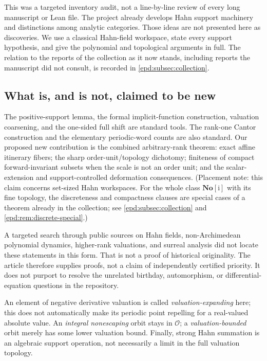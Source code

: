 \documentclass[11pt,a4paper]{article}
\numberwithin{equation}{section}
\theoremstyle{plain}
\theoremstyle{definition}
\theoremstyle{remark}
\newcommand{\No}{\mathbf{No}}
\newcommand{\OO}{\mathcal O}
\newcommand{\smallbox}[2]{\begin{tcolorbox}[colback=soft,colframe=ink,
 boxrule=0.4pt,arc=1mm,title={#1},fonttitle=\bfseries]#2\end{tcolorbox}}
\begin{document}
This was a targeted inventory audit, not a line-by-line review of every
long manuscript or Lean file. The project already develops Hahn support
machinery and distinctions among analytic categories. Those ideas are
not presented here as discoveries. We use a classical Hahn-field
workspace, state every support hypothesis, and give the polynomial and
topological arguments in full.
The relation to the reports of the collection as it now stands, including
reports the manuscript did not consult, is recorded in
\cref{epd:subsec:collection}.

\subsection{What is, and is not, claimed to be new}
The positive-support lemma, the formal implicit-function construction,
valuation coarsening, and the one-sided full shift are standard tools.
The rank-one Cantor construction and the elementary periodic-word counts
are also standard. Our proposed new contribution is the combined
arbitrary-rank theorem: exact affine itinerary fibers; the sharp
order-unit/topology dichotomy; finiteness of compact forward-invariant
subsets when the scale is not an order unit; and the scalar-extension and
support-controlled deformation consequences. (Placement note: this claim
concerns set-sized Hahn workspaces. For the whole class $\No[\mathrm i]$
with its fine topology, the discreteness and compactness clauses are
special cases of a theorem already in the collection; see
\cref{epd:subsec:collection} and \cref{epd:rem:discrete-special}.)

A targeted search through public sources on Hahn fields,
non-Archimedean polynomial dynamics, higher-rank valuations, and surreal
analysis did not locate these statements in this form. That is not a
proof of historical originality. The article therefore supplies proofs,
not a claim of independently certified priority. It does not purport to
resolve the unrelated birthday, automorphism, or differential-equation
questions in the repository.

\smallbox{Three distinctions that cannot be suppressed}{
An element of negative derivative valuation is called
\emph{valuation-expanding} here; this does not automatically make its
periodic point repelling for a real-valued absolute value. An
\emph{integral nonescaping} orbit stays in $\OO$; a
\emph{valuation-bounded} orbit merely has some lower valuation bound.
Finally, strong Hahn summation is an algebraic support operation, not
necessarily a limit in the full valuation topology.}
\end{document}
